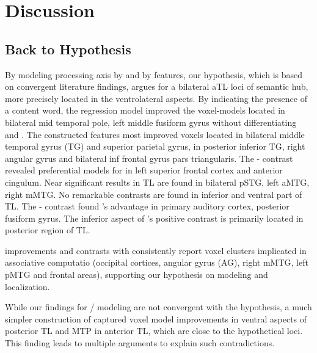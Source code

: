 \chapter{Discussion} %

\label{chap:discussions} 

\section{Back to Hypothesis}

By modeling \similarity processing axis by  and \association by  features, our hypothesis, which is based on convergent literature findings, argues for a bilateral aTL loci of semantic hub, more precisely located in the ventrolateral aspects. By indicating the presence of a content word, the regression model improved the voxel-models located in bilateral mid temporal pole, left middle fusiform gyrus without differentiating \similarity and \association. The constructed  features most improved voxels located in bilateral middle temporal gyrus (TG) and superior parietal gyrus,  in posterior inferior TG, right angular gyrus and bilateral inf frontal gyrus pars triangularis. The - contrast revealed preferential models for  in left superior frontal cortex and anterior cingulum. Near significant results in TL are found in bilateral pSTG, left aMTG, right mMTG. No remarkable contrasts are found in inferior and ventral part of TL. The - contrast found 's advantage in primary auditory cortex, posterior fusiform gyrus. The inferior aspect of 's positive contrast is primarily located in posterior region of TL.

 improvements and contrasts with \similarity consistently report voxel clusters implicated in associative computatio (occipital cortices, angular gyrus (AG), right mMTG, left pMTG and frontal areas), supporting our hypothesis on \association modeling and localization.

While our findings for / modeling \similarity are not convergent with the hypothesis, a much simpler construction of  captured voxel model improvements in ventral aspects of posterior TL and MTP in anterior TL, which are close to the hypothetical loci. This finding leads to multiple arguments to explain such contradictions. 


